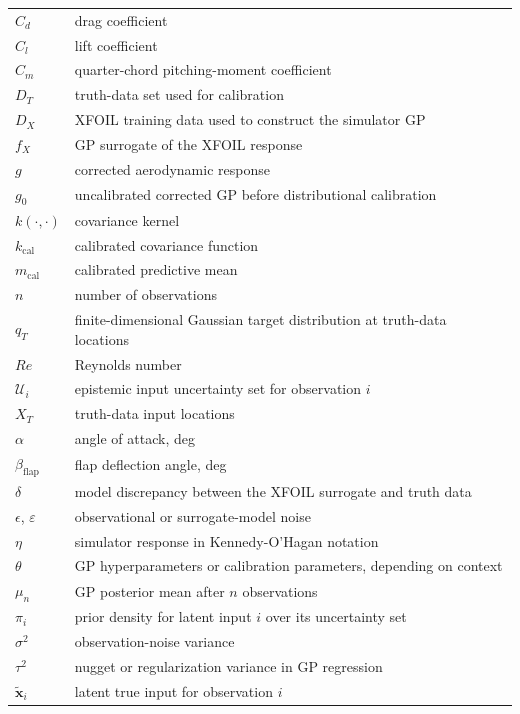 \documentclass[journal]{new-aiaa}
\begin{document}
{\renewcommand\arraystretch{1.0}
\noindent\begin{longtable*}{@{}l @{\quad=\quad} p{5.45in}@{}}
$C_d$ & drag coefficient \\
$C_l$ & lift coefficient \\
$C_m$ & quarter-chord pitching-moment coefficient \\
$D_T$ & truth-data set used for calibration \\
$D_X$ & XFOIL training data used to construct the simulator GP \\
$f_X$ & GP surrogate of the XFOIL response \\
$g$ & corrected aerodynamic response \\
$g_0$ & uncalibrated corrected GP before distributional calibration \\
$k(\cdot,\cdot)$ & covariance kernel \\
$k_{\mathrm{cal}}$ & calibrated covariance function \\
$m_{\mathrm{cal}}$ & calibrated predictive mean \\
$n$ & number of observations \\
$q_T$ & finite-dimensional Gaussian target distribution at truth-data locations \\
$Re$ & Reynolds number \\
$\mathcal{U}_i$ & epistemic input uncertainty set for observation $i$ \\
$X_T$ & truth-data input locations \\
$\alpha$ & angle of attack, deg \\
$\beta_{\mathrm{flap}}$ & flap deflection angle, deg \\
$\delta$ & model discrepancy between the XFOIL surrogate and truth data \\
$\epsilon$, $\varepsilon$ & observational or surrogate-model noise \\
$\eta$ & simulator response in Kennedy-O'Hagan notation \\
$\theta$ & GP hyperparameters or calibration parameters, depending on context \\
$\mu_n$ & GP posterior mean after $n$ observations \\
$\pi_i$ & prior density for latent input $i$ over its uncertainty set \\
$\sigma^2$ & observation-noise variance \\
$\tau^2$ & nugget or regularization variance in GP regression \\
$\tilde{\mathbf{x}}_i$ & latent true input for observation $i$ \\

\end{longtable*}}
\end{document}

